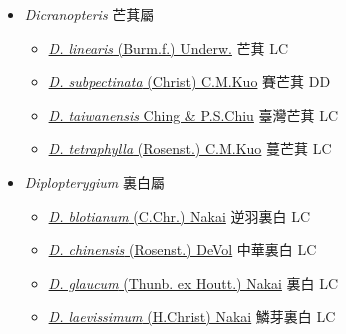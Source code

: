 
  \begin{itemize}
 \item[    ] \textit{Dicranopteris} 芒萁屬
                                
  \begin{itemize}
        \item[] \href{http://www.theplantlist.org/tpl1.1/search?q=Dicranopteris+linearis}{\textit{D. linearis} (Burm.f.) Underw.}   芒萁   LC
        \item[] \href{http://www.theplantlist.org/tpl1.1/search?q=Dicranopteris+subpectinata}{\textit{D. subpectinata} (Christ) C.M.Kuo}   賽芒萁   DD
        \item[] \href{http://www.theplantlist.org/tpl1.1/search?q=Dicranopteris+taiwanensis}{\textit{D. taiwanensis} Ching \& P.S.Chiu}   臺灣芒萁   LC
        \item[] \href{http://www.theplantlist.org/tpl1.1/search?q=Dicranopteris+tetraphylla}{\textit{D. tetraphylla} (Rosenst.) C.M.Kuo}   蔓芒萁   LC
  \end{itemize}
 \item[    ] \textit{Diplopterygium} 裏白屬
                                
  \begin{itemize}
        \item[] \href{http://www.theplantlist.org/tpl1.1/search?q=Diplopterygium+blotianum}{\textit{D. blotianum} (C.Chr.) Nakai}   逆羽裏白   LC
        \item[] \href{http://www.theplantlist.org/tpl1.1/search?q=Diplopterygium+chinensis}{\textit{D. chinensis} (Rosenst.) DeVol}   中華裏白   LC
        \item[] \href{http://www.theplantlist.org/tpl1.1/search?q=Diplopterygium+glaucum}{\textit{D. glaucum} (Thunb. ex Houtt.) Nakai}   裏白   LC
        \item[] \href{http://www.theplantlist.org/tpl1.1/search?q=Diplopterygium+laevissimum}{\textit{D. laevissimum} (H.Christ) Nakai}   鱗芽裏白   LC
  \end{itemize}
  \end{itemize}
